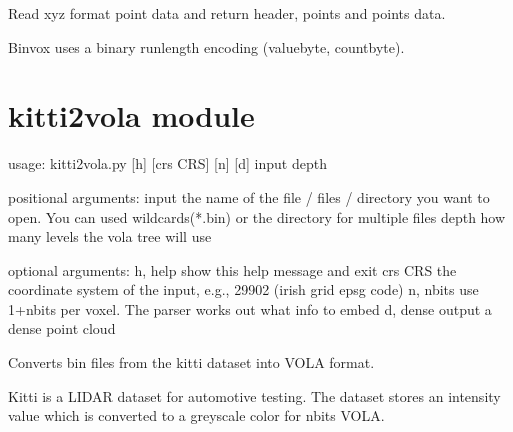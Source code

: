 \documentclass[letterpaper,10pt,english]{sphinxmanual}
\begin{document}

\begin{fulllineitems}
\label{\detokenize{binvox2vola:binvox2vola.parse_binvox}}
Read xyz format point data and return header, points and points data.

\end{fulllineitems}


\begin{fulllineitems}
\label{\detokenize{binvox2vola:binvox2vola.runlength_to_xyz}}
Binvox uses a binary runlength encoding (valuebyte, countbyte).

\end{fulllineitems}



\section{kitti2vola module}
\label{\detokenize{kitti2vola:kitti2vola-module}}\label{\detokenize{kitti2vola::doc}}
\begin{sphinxVerbatim}[commandchars=\\\{\}]
usage: kitti2vola.py [\PYGZhy{}h] [\PYGZhy{}\PYGZhy{}crs CRS] [\PYGZhy{}n] [\PYGZhy{}d] input depth

positional arguments:
  input        the name of the file / files / directory you want to open. You
               can used wildcards(*.bin) or the directory for multiple files
  depth        how many levels the vola tree will use

optional arguments:
  \PYGZhy{}h, \PYGZhy{}\PYGZhy{}help   show this help message and exit
  \PYGZhy{}\PYGZhy{}crs CRS    the coordinate system of the input, e.g., 29902 (irish grid
               epsg code)
  \PYGZhy{}n, \PYGZhy{}\PYGZhy{}nbits  use 1+nbits per voxel. The parser works out what info to embed
  \PYGZhy{}d, \PYGZhy{}\PYGZhy{}dense  output a dense point cloud
\end{sphinxVerbatim}
\label{\detokenize{kitti2vola:module-kitti2vola}}
Converts bin files from the kitti dataset into VOLA format.

Kitti is a LIDAR dataset for automotive testing. The dataset
stores an intensity value which is converted to a greyscale
color for nbits VOLA.
\end{document}
